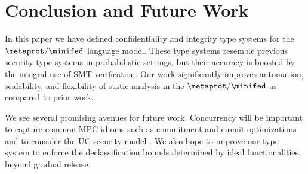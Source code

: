 \section{Conclusion and Future Work}

In this paper we have defined confidentiality and integrity type
systems for the $\metaprot/\minifed$ language model. These type
systems resemble previous security type systems in probabilistic
settings, but their accuracy is boosted by the integral use of SMT
verification.  Our work significantly improves automation,
scalability, and flexibility of static analysis in the
$\metaprot/\minifed$ as compared to prior work.

We see several promising avenues for future work. Concurrency will be
important to capture common MPC idioms such as commitment and circuit
optimizations and to consider the UC security model
\cite{evans2018pragmatic,viaduct-UC}. We also hope to improve our type
system to enforce the declassification bounds determined by ideal
functionalities, beyond gradual release.

